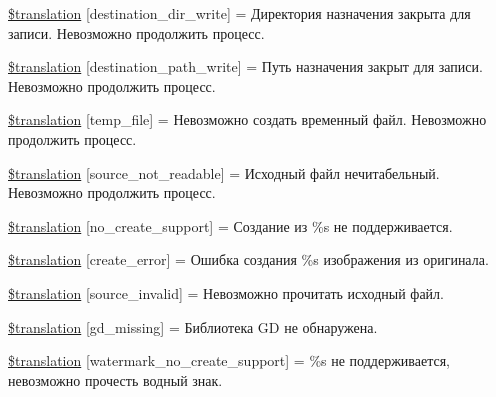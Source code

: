 \begin{DoxyCompactItemize}
\item 
\hyperlink{class_8upload_8ru___r_u_8php_a97608ea194a616db49141a0e6dee900c}{\$translation} \mbox{[}\textquotesingle{}destination\+\_\+dir\+\_\+write\textquotesingle{}\mbox{]} = \textquotesingle{}Директория назначения закрыта для записи. Невозможно продолжить процесс.\textquotesingle{}
\item 
\hyperlink{class_8upload_8ru___r_u_8php_a40e4e1962226b89fd76da5819a9602b0}{\$translation} \mbox{[}\textquotesingle{}destination\+\_\+path\+\_\+write\textquotesingle{}\mbox{]} = \textquotesingle{}Путь назначения закрыт для записи. Невозможно продолжить процесс.\textquotesingle{}
\item 
\hyperlink{class_8upload_8ru___r_u_8php_a2baece8da11e20d45175db91851ec3e3}{\$translation} \mbox{[}\textquotesingle{}temp\+\_\+file\textquotesingle{}\mbox{]} = \textquotesingle{}Невозможно создать временный файл. Невозможно продолжить процесс.\textquotesingle{}
\item 
\hyperlink{class_8upload_8ru___r_u_8php_a922967ca2df0efdd455261142d8e5715}{\$translation} \mbox{[}\textquotesingle{}source\+\_\+not\+\_\+readable\textquotesingle{}\mbox{]} = \textquotesingle{}Исходный файл нечитабельный. Невозможно продолжить процесс.\textquotesingle{}
\item 
\hyperlink{class_8upload_8ru___r_u_8php_a346dfd1ade29f583dd20d345c436859f}{\$translation} \mbox{[}\textquotesingle{}no\+\_\+create\+\_\+support\textquotesingle{}\mbox{]} = \textquotesingle{}Создание из \%s не поддерживается.\textquotesingle{}
\item 
\hyperlink{class_8upload_8ru___r_u_8php_a53013ce9255c4e1849098ddd9fdb2b3f}{\$translation} \mbox{[}\textquotesingle{}create\+\_\+error\textquotesingle{}\mbox{]} = \textquotesingle{}Ошибка создания \%s изображения из оригинала.\textquotesingle{}
\item 
\hyperlink{class_8upload_8ru___r_u_8php_a6ab0a660b457eaf2d3434b225449fdd6}{\$translation} \mbox{[}\textquotesingle{}source\+\_\+invalid\textquotesingle{}\mbox{]} = \textquotesingle{}Невозможно прочитать исходный файл.\textquotesingle{}
\item 
\hyperlink{class_8upload_8ru___r_u_8php_a7f3dfcc0db4bbc0f2e7210c439798e56}{\$translation} \mbox{[}\textquotesingle{}gd\+\_\+missing\textquotesingle{}\mbox{]} = \textquotesingle{}Библиотека G\+D не обнаружена.\textquotesingle{}
\item 
\hyperlink{class_8upload_8ru___r_u_8php_a82d5853430ab72dc1f9799ec36144cc6}{\$translation} \mbox{[}\textquotesingle{}watermark\+\_\+no\+\_\+create\+\_\+support\textquotesingle{}\mbox{]} = \textquotesingle{}\%s не поддерживается, невозможно прочесть водный знак.\textquotesingle{}

\end{DoxyCompactItemize}
